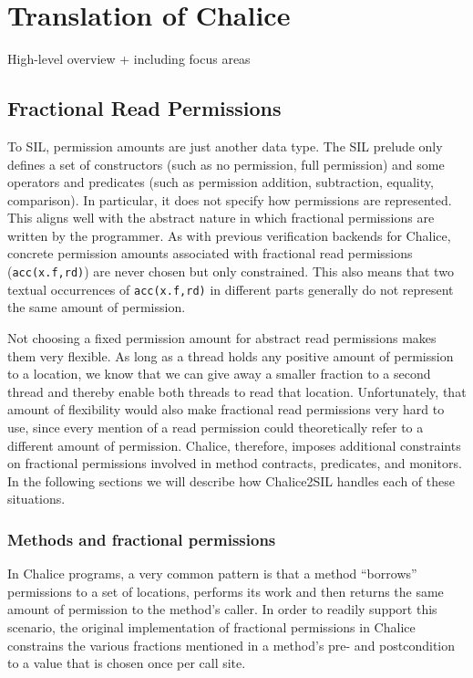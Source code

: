 
\section{Translation of Chalice}\label{sct:trans}

\begin{sketch}
High-level overview + including focus areas
\end{sketch}

\subsection{Fractional Read Permissions}\label{sct:frp}
To SIL, permission amounts are just another data type. 
The SIL prelude only defines a set of constructors (such as no permission, full permission) and some operators and predicates (such as permission addition, subtraction, equality, comparison). 
In particular, it does not specify how permissions are represented. 
This aligns well with the abstract nature in which fractional permissions are written by the programmer.
As with previous verification backends for Chalice, concrete permission amounts associated with fractional read permissions (\lstinline!acc(x.f,rd)!) are never chosen but only constrained. 
This also means that two textual occurrences of \lstinline!acc(x.f,rd)! in different parts generally do not represent the same amount of permission.

Not choosing a fixed permission amount for abstract read permissions makes them very flexible.
As long as a thread holds any positive amount of permission to a location, we know that we can give away a smaller fraction to a second thread and thereby enable both threads to read that location.
Unfortunately, that amount of flexibility would also make fractional read permissions very hard to use, since every mention of a read permission could theoretically refer to a different amount of permission.
Chalice, therefore, imposes additional constraints on fractional permissions involved in method contracts, predicates, and monitors.
In the following sections we will describe how Chalice2SIL handles each of these situations.

\subsubsection{Methods and fractional permissions}\label{sct:meth}
In Chalice programs, a very common pattern is that a method ``borrows'' permissions to a set of locations, performs its work and then returns the same amount of permission to the method's caller.
In order to readily support this scenario, the original implementation of fractional permissions in Chalice constrains the various fractions mentioned in a method's pre- and postcondition to a value that is chosen once per call site.

